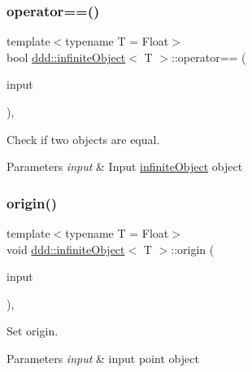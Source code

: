 \subsubsection{\texorpdfstring{operator==()}{operator==()}}
{\footnotesize\ttfamily template$<$typename T = Float$>$ \\
bool \hyperlink{classddd_1_1infinite_object}{ddd\+::infinite\+Object}$<$ T $>$\+::operator== (\begin{DoxyParamCaption}\item[{const \hyperlink{classddd_1_1infinite_object}{infinite\+Object}$<$ T $>$ \&}]{input }\end{DoxyParamCaption})\hspace{0.3cm}{\ttfamily [inline]}, {\ttfamily [inherited]}}



Check if two objects are equal. 


\begin{DoxyParams}{Parameters}
{\em input} & Input \hyperlink{classddd_1_1infinite_object}{infinite\+Object} object \\
\hline
\end{DoxyParams}
\mbox{\label{classddd_1_1infinite_object_a82ecd5fc09ecfe5b1fe9a2609dd1465e}} 
\subsubsection{\texorpdfstring{origin()}{origin()}}
{\footnotesize\ttfamily template$<$typename T = Float$>$ \\
void \hyperlink{classddd_1_1infinite_object}{ddd\+::infinite\+Object}$<$ T $>$\+::origin (\begin{DoxyParamCaption}\item[{const \hyperlink{classddd_1_1point}{point}$<$ T $>$ \&}]{input }\end{DoxyParamCaption})\hspace{0.3cm}{\ttfamily [inline]}, {\ttfamily [inherited]}}



Set origin. 


\begin{DoxyParams}{Parameters}
{\em input} & input point object \\
\hline
\end{DoxyParams}
\mbox{\label{classddd_1_1infinite_object_a72649daa44060efdbef986ab9d90f3f6}} 
